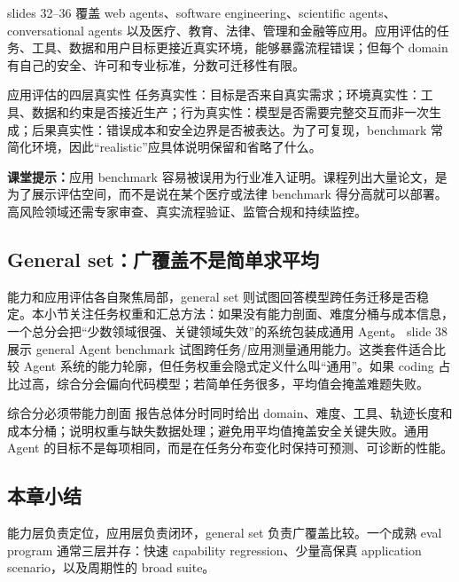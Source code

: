 slides 32--36 覆盖 web agents、software engineering、scientific agents、conversational agents 以及医疗、教育、法律、管理和金融等应用。应用评估的任务、工具、数据和用户目标更接近真实环境，能够暴露流程错误；但每个 domain 有自己的安全、许可和专业标准，分数可迁移性有限。


\begin{knowledgebox}{应用评估的四层真实性}
任务真实性：目标是否来自真实需求；环境真实性：工具、数据和约束是否接近生产；行为真实性：模型是否需要完整交互而非一次生成；后果真实性：错误成本和安全边界是否被表达。为了可复现，benchmark 常简化环境，因此“realistic”应具体说明保留和省略了什么。
\end{knowledgebox}

\textbf{课堂提示：}应用 benchmark 容易被误用为行业准入证明。课程列出大量论文，是为了展示评估空间，而不是说在某个医疗或法律 benchmark 得分高就可以部署。高风险领域还需专家审查、真实流程验证、监管合规和持续监控。

\subsection{General set：广覆盖不是简单求平均}

能力和应用评估各自聚焦局部，general set 则试图回答模型跨任务迁移是否稳定。本小节关注任务权重和汇总方法：如果没有能力剖面、难度分桶与成本信息，一个总分会把“少数领域很强、关键领域失效”的系统包装成通用 Agent。
slide 38 展示 general Agent benchmark 试图跨任务/应用测量通用能力。这类套件适合比较 Agent 系统的能力轮廓，但任务权重会隐式定义什么叫“通用”。如果 coding 占比过高，综合分会偏向代码模型；若简单任务很多，平均值会掩盖难题失败。


\begin{importantbox}{综合分必须带能力剖面}
报告总体分时同时给出 domain、难度、工具、轨迹长度和成本分桶；说明权重与缺失数据处理；避免用平均值掩盖安全关键失败。通用 Agent 的目标不是每项相同，而是在任务分布变化时保持可预测、可诊断的性能。
\end{importantbox}

\subsection{本章小结}

能力层负责定位，应用层负责闭环，general set 负责广覆盖比较。一个成熟 eval program 通常三层并存：快速 capability regression、少量高保真 application scenario，以及周期性的 broad suite。

